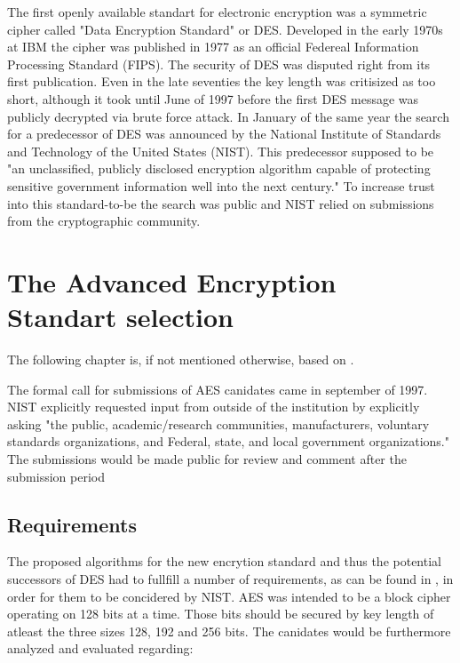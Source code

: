 The first openly available standart for electronic encryption was a symmetric cipher called "Data Encryption Standard" or DES. Developed in the early 1970s at IBM the cipher was published in 1977 as an official Federeal Information Processing Standard (FIPS). The security of DES was disputed right from its first publication. Even in the late seventies the key length was critisized as too short, although it took until June of 1997 before the first DES message was publicly decrypted via brute force attack. In January of the same year the search for a predecessor of DES was announced by the National Institute of Standards and Technology of the United States (NIST). This predecessor supposed to be "an unclassified, publicly disclosed encryption algorithm capable of protecting sensitive government information well into the next century." To increase trust into this standard-to-be the search was public and NIST relied on submissions from the cryptographic community. 


\section{The Advanced Encryption Standart selection}
\label{ch:aes-selection}

The following chapter is, if not mentioned otherwise, based on \cite{nistdevoverview}.

The formal call for submissions of AES canidates came in september of 1997. NIST explicitly requested input from outside of the institution by explicitly asking "the public, academic/research communities, manufacturers, voluntary standards organizations, and Federal, state, and local government organizations." The submissions would be made public for review and comment after the submission period

\subsection{Requirements}
\label{ch:requirements}

The proposed algorithms for the new encrytion standard and thus the
potential successors of DES had to fullfill a number of requirements, as can be found in \cite{announcementrequest}, in order for them to be concidered by NIST. AES was intended to be a block
cipher operating on 128 bits at a time. Those bits should be secured by
key length of atleast the three sizes 128, 192 and 256 bits. 
The canidates would be furthermore analyzed and evaluated regarding:

